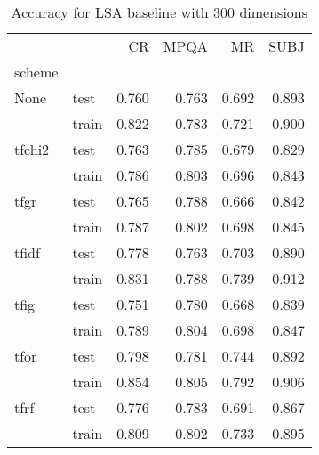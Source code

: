 \begin{table}[h]
\begin{center}

\begin{tabular}{llrrrr}
\toprule
{} &      &  CR &  MPQA &  MR &  SUBJ \\
scheme &  &            &              &            &              \\
\midrule
None & test &      0.760 &        0.763 &      0.692 &        0.893 \\
{} & train &      0.822 &        0.783 &      0.721 &        0.900 \\
tfchi2 & test &      0.763 &        0.785 &      0.679 &        0.829 \\
{} & train &      0.786 &        0.803 &      0.696 &        0.843 \\
tfgr & test &      0.765 &        0.788 &      0.666 &        0.842 \\
{} & train &      0.787 &        0.802 &      0.698 &        0.845 \\
tfidf & test &      0.778 &        0.763 &      0.703 &        0.890 \\
{} & train &      0.831 &        0.788 &      0.739 &        0.912 \\
tfig & test &      0.751 &        0.780 &      0.668 &        0.839 \\
{} & train &      0.789 &        0.804 &      0.698 &        0.847 \\
tfor & test &      0.798 &        0.781 &      0.744 &        0.892 \\
{} & train &      0.854 &        0.805 &      0.792 &        0.906 \\
tfrf & test &      0.776 &        0.783 &      0.691 &        0.867 \\
{} & train &      0.809 &        0.802 &      0.733 &        0.895 \\
\bottomrule
\end{tabular}

\caption[Accuracy for LSA baseline with 300 dimensions]{Accuracy for LSA baseline with 300 dimensions}
\label{tab:lsa:resuts:abs:300}
\end{center}
\end{table}





